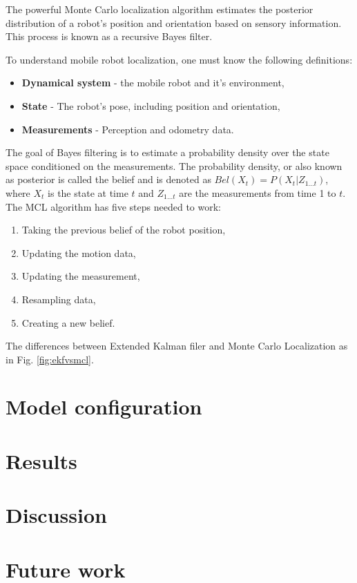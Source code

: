 \documentclass[10pt,journal,compsoc]{IEEEtran}
\begin{document}
    The powerful Monte Carlo localization algorithm estimates the posterior distribution of a robot’s position and orientation based on sensory information. This process is known as a recursive Bayes filter.

    \noindent To understand mobile robot localization, one must know the following definitions:

    \begin{itemize}
        \item \textbf{Dynamical system} - the mobile robot and it's environment,
        \item \textbf{State} - The robot's pose, including position and orientation,
        \item \textbf{Measurements} - Perception and odometry data.
    \end{itemize}

    The goal of Bayes filtering is to estimate a probability density over the state space conditioned on the measurements. The probability density, or also known as posterior is called the belief and is denoted as $Bel(X_{t}) = P(X_{t}|Z_{1...t})$, where $X_{t}$ is the state at time $t$ and $Z_{1...t}$ are the measurements from time 1 to $t$.\\

    \noindent The MCL algorithm has five steps needed to work:

    \begin{enumerate}
        \item Taking the previous belief of the robot position,
        \item Updating the motion data,
        \item Updating the measurement,
        \item Resampling data,
        \item Creating a new belief.
    \end{enumerate}

    The differences between Extended Kalman filer and Monte Carlo Localization as in Fig. \ref{fig:ekfvsmcl}.

    \section{Model configuration}

    \section{Results}

    \section{Discussion}

    \section{Future work}
    
   
   
\end{document}
